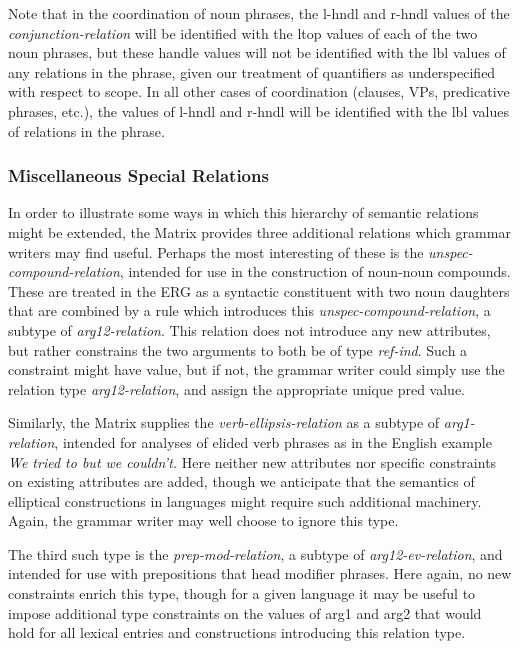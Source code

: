 \documentclass[12pt]{article}
\begin{document}
Note that in the coordination of noun phrases, the {\sc l-hndl} and 
{\sc r-hndl} values of the {\it conjunction-relation} will be identified 
with the
{\sc ltop} values of each of the two noun phrases, but these handle values
will not be identified with the {\sc lbl} values of any relations in the
phrase, given our treatment of quantifiers as underspecified with respect to
scope.  In all other cases of coordination (clauses, VPs, predicative phrases,
etc.), the values of {\sc l-hndl} and {\sc r-hndl} will be identified with
the {\sc lbl} values of relations in the phrase.


\subsubsection{Miscellaneous Special Relations}

In order to illustrate some ways in which this hierarchy of semantic relations
might be extended, the Matrix provides three additional relations which 
grammar writers may find useful.  Perhaps the most interesting of these is
the {\it unspec-compound-relation}, intended for use in the construction of
noun-noun compounds.  These are treated in the ERG as a syntactic constituent 
with two noun daughters that are combined by a rule which introduces this
{\it unspec-compound-relation}, a subtype of {\it arg12-relation}.  This
relation does not introduce any new attributes, but rather constrains the
two arguments to both be of type {\it ref-ind}.  Such a constraint might have
value, but if not, the grammar writer could simply use the relation type
{\it arg12-relation}, and assign the appropriate unique {\sc pred} value.

Similarly, the Matrix supplies the {\it verb-ellipsis-relation} as a subtype of
{\it arg1-relation}, intended for analyses of elided verb phrases as in the
English example {\it We tried to but we couldn't.}  Here neither new attributes
nor specific constraints on existing attributes are added, though we 
anticipate that the semantics of elliptical constructions in languages might
require such additional machinery.  Again, the grammar writer may well choose
to ignore this type.

The third such type is the {\it prep-mod-relation}, a subtype of 
{\it arg12-ev-relation}, and intended for use with prepositions that head
modifier phrases.  Here again, no new constraints enrich this type, though
for a given language it may be useful to impose additional type constraints
on the values of {\sc arg1} and {\sc arg2} that would hold for all lexical
entries and constructions introducing this relation type.  
\end{document}
